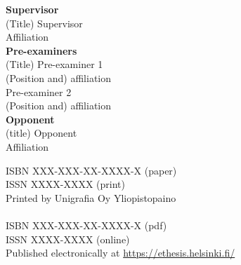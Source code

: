 \documentclass[12pt]{book}
\begin{document}
{}

\frontmatter



%



\pagestyle{fancy}
\fancyhead[RO,LE]{\thepage}
\fancyhead[LO,RE]{\nouppercase{\rightmark}}
\setlength{\headheight}{15pt}
\fancyfoot{}



\noindent \textbf{Supervisor} \\
\indent (Title) Supervisor \\
\indent Affiliation \\

\thispagestyle{empty}
\noindent \textbf{Pre-examiners} \\
\indent (Title) Pre-examiner 1 \\
\indent (Position and) affiliation
\vspace{0.1 cm} \\
\indent Pre-examiner 2 \\
\indent (Position and) affiliation \\

\noindent \textbf{Opponent} \\
\indent (title) Opponent \\
\indent Affiliation \\

\vfill

\noindent ISBN XXX-XXX-XX-XXXX-X (paper)\\
\noindent ISSN XXXX-XXXX (print) \\
\noindent Printed by Unigrafia Oy Yliopistopaino \\
\\

\noindent ISBN XXX-XXX-XX-XXXX-X  (pdf) \\
\noindent ISSN XXXX-XXXX (online) \\
\noindent Published electronically at \url{https://ethesis.helsinki.fi/} \\
\end{document}
